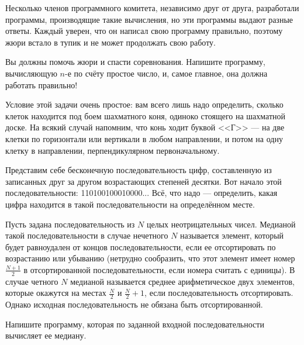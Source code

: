 Несколько членов программного комитета, независимо друг от друга, разработали программы, производящие такие вычисления, но эти программы выдают разные ответы. Каждый уверен, что он написал свою программу правильно, поэтому жюри встало в тупик и не может продолжать свою работу.

Вы должны помочь жюри и спасти соревнования. Напишите программу, вычисляющую $n$-е по счёту простое число, и, самое главное, она должна работать правильно!

\z Условие этой задачи очень простое: вам всего лишь надо определить, сколько клеток находится под боем шахматного коня, одиноко стоящего на шахматной доске. На всякий случай напомним, что конь ходит буквой <<Г>> --- на две клетки по горизонтали или вертикали в любом направлении, и потом на одну клетку в направлении, перпендикулярном первоначальному.

\z Представим себе бесконечную последовательность цифр, составленную из записанных друг за другом возрастающих степеней десятки. Вот начало этой последовательности: 110100100010000... Всё, что надо --- определить, какая цифра находится в такой последовательности на определённом месте.

\z Пусть задана последовательность из $N$ целых неотрицательных чисел. Медианой такой последовательности в случае нечетного $N$ называется элемент, который будет равноудален от концов последовательности, если ее отсортировать по возрастанию или убыванию (нетрудно сообразить, что этот элемент имеет номер $\frac{N+1}{2}$ в отсортированной последовательности, если номера считать с единицы). В случае четного $N$ медианой называется среднее арифметическое двух элементов, которые окажутся на местах $\frac{N}{2}$ и $\frac{N}{2}+1$, если последовательность отсортировать. Однако исходная последовательность не обязана быть отсортированной.

Напишите программу, которая по заданной входной последовательности вычисляет ее медиану.
